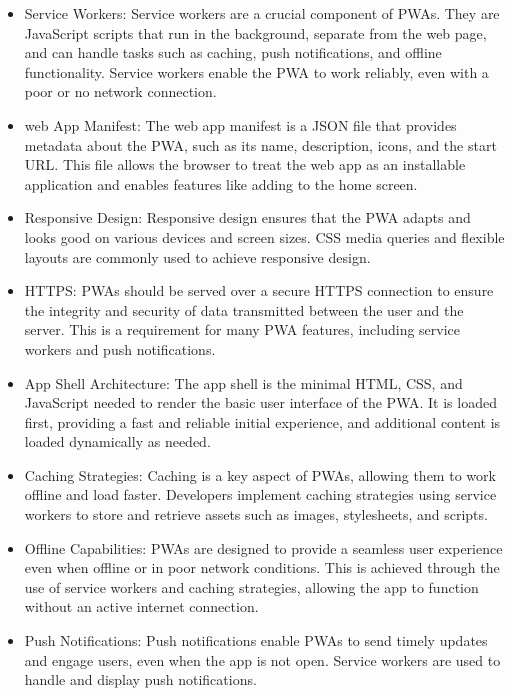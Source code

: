 \documentclass[12pt,a4paper, twosite]{article}
\begin{document}
\begin{itemize}
  \item Service Workers:
    Service workers are a crucial component of PWAs. They are JavaScript scripts that run in the background, separate from the web page, and can handle tasks such as caching, push notifications, and offline functionality. Service workers enable the PWA to work reliably, even with a poor or no network connection.
  
  \item web App Manifest:
    The web app manifest is a JSON file that provides metadata about the PWA, such as its name, description, icons, and the start URL. This file allows the browser to treat the web app as an installable application and enables features like adding to the home screen.
  
  \item Responsive Design:
    Responsive design ensures that the PWA adapts and looks good on various devices and screen sizes. CSS media queries and flexible layouts are commonly used to achieve responsive design.
  
  \item HTTPS:
    PWAs should be served over a secure HTTPS connection to ensure the integrity and security of data transmitted between the user and the server. This is a requirement for many PWA features, including service workers and push notifications.
  
  \item App Shell Architecture:
    The app shell is the minimal HTML, CSS, and JavaScript needed to render the basic user interface of the PWA. It is loaded first, providing a fast and reliable initial experience, and additional content is loaded dynamically as needed.
  
  \item Caching Strategies:
    Caching is a key aspect of PWAs, allowing them to work offline and load faster. Developers implement caching strategies using service workers to store and retrieve assets such as images, stylesheets, and scripts.
  
  \item Offline Capabilities:
    PWAs are designed to provide a seamless user experience even when offline or in poor network conditions. This is achieved through the use of service workers and caching strategies, allowing the app to function without an active internet connection.
  
  \item Push Notifications:
    Push notifications enable PWAs to send timely updates and engage users, even when the app is not open. Service workers are used to handle and display push notifications.
  

\end{itemize}
\end{document}
